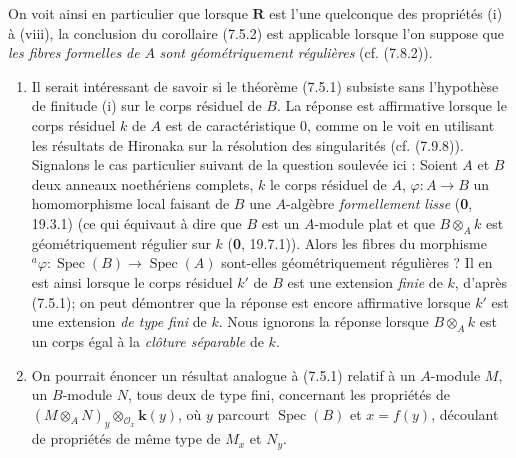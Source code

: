 \begin{examples}[7.5.3]
On voit ainsi en particulier que lorsque $\boldsymbol R$ est l'une quelconque
des propriétés (i) à (viii), la conclusion du corollaire (7.5.2) est applicable
lorsque l'on suppose que \emph{les fibres formelles de} $A$ \emph{sont géométriquement
régulières} (cf. (7.8.2)).
\end{examples}

\begin{remarks}[7.5.4]
\begin{enumerate}
\item[(i)] Il serait intéressant de savoir si le théorème (7.5.1)
subsiste sans l'hypothèse de finitude (i) sur le corps résiduel de $B$. La
réponse est affirmative lorsque le corps résiduel $k$ de $A$ est de
caractéristique 0, comme on le voit en utilisant les résultats de Hironaka sur
la résolution des singularités (cf. (7.9.8)). Signalons le cas particulier
suivant de la question soulevée ici : Soient $A$ et $B$ deux anneaux
noethériens complets, $k$ le corps résiduel de $A$,
$\varphi:A\to B$ un homomorphisme local faisant de $B$ une $A$-algèbre
\emph{formellement lisse} (\textbf{0}, 19.3.1) (ce qui équivaut à dire que $B$ est un
$A$-module plat et que $B\otimes_A k$ est géométriquement régulier sur $k$
(\textbf{0}, 19.7.1)). Alors les fibres du morphisme
${}^a\varphi:\operatorname{Spec}(B)\to\operatorname{Spec}(A)$ sont-elles
géométriquement régulières ? Il en est ainsi lorsque le corps résiduel $k'$ de
$B$ est une extension \emph{finie} de $k$, d'après (7.5.1); on peut démontrer que la
réponse est encore affirmative lorsque $k'$ est une extension \emph{de type fini} de
$k$. Nous ignorons la réponse lorsque $B\otimes_A k$ est un corps égal à la
\emph{clôture séparable} de $k$.

\item[(ii)] On pourrait énoncer un résultat analogue à (7.5.1) relatif
à un $A$-module $M$, un $B$-module $N$, tous deux de type fini, concernant les
propriétés de
$(M\otimes_A N)_y\otimes_{\mathscr O_x}\boldsymbol{k}(y)$,
où $y$ parcourt $\operatorname{Spec}(B)$ et $x=f(y)$, découlant de propriétés
de même type de $M_x$ et $N_y$.


\end{enumerate}
\end{remarks}
